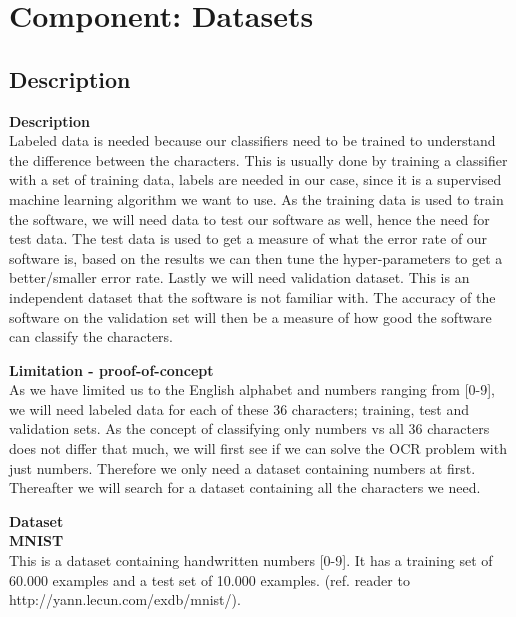 \documentclass[Report.tex]{subfiles}
\begin{document}
\section{Component: Datasets}
\label{Method:Datasets}
\subsection{Description}

\begin{flushleft}
  \textbf{Description} \\
  Labeled data is needed because our classifiers need to be trained to understand
  the difference between the characters. This is usually done by training a
  classifier with a set of training data, labels are needed in our case,
  since it is a supervised machine learning algorithm we want to use. As the
  training data is used to train the software, we will need data to test our
  software as well, hence the need for test data. The test data is used to get a
  measure of what the error rate of our software is, based on the results we
  can then tune the hyper-parameters to get a better/smaller error rate. Lastly
  we will need validation dataset. This is an independent dataset that the software
  is not familiar with. The accuracy of the software on the validation set will
  then be a measure of how good the software can classify the characters.
\end{flushleft}

\begin{flushleft}
  \textbf{Limitation - proof-of-concept} \\
  As we have limited us to the English alphabet and numbers ranging from [0-9],
  we will need labeled data for each of these 36 characters; training, test and
  validation sets. As the concept of classifying only numbers vs all 36
  characters does not differ that much, we will first see if we can solve the OCR
  problem with just numbers. Therefore we only need a dataset containing numbers
  at first. Thereafter we will search for a dataset containing all the characters
  we need.
\end{flushleft}

\begin{flushleft}
  \textbf{Dataset} \\
  \textbf{MNIST} \\
  This is a dataset containing handwritten numbers [0-9].
  It has a training set of 60.000 examples and a test set of 10.000 examples.
  (ref. reader to http://yann.lecun.com/exdb/mnist/).
\end{flushleft}
\end{document}
